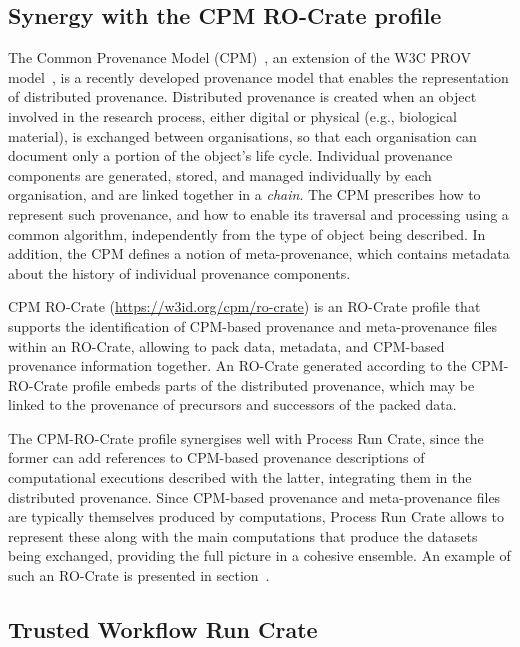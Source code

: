 \documentclass[10pt,letterpaper]{article}
\begin{document}
    
  \subsection{Synergy with the CPM RO-Crate profile}\label{synergy-with-the-cpm-ro-crate-profile}
  
  The Common Provenance Model (CPM)~\cite{Wittner 2022}, an extension of the W3C PROV model~\cite{Moreau 2013}, is a recently developed provenance model that enables the representation of distributed provenance.
  Distributed provenance is created when an object involved in the research process, either digital or physical (e.g., biological material), is exchanged between organisations, so that each organisation can document only a portion of the object's life cycle.
  Individual provenance components are generated, stored, and managed individually by each organisation, and are linked together in a \emph{chain}.
  The CPM prescribes how to represent such provenance, and how to enable its traversal and processing using a common algorithm, independently from the type of object being described.
  In addition, the CPM defines a notion of meta-provenance, which contains metadata about the history of individual provenance components.
  
  CPM RO-Crate (\url{https://w3id.org/cpm/ro-crate}) is an RO-Crate profile that supports the identification of CPM-based provenance and meta-provenance files within an RO-Crate, allowing to pack data, metadata, and CPM-based provenance information together.
  An RO-Crate generated according to the CPM-RO-Crate profile embeds parts of the distributed provenance, which may be linked to the provenance of precursors and successors of the packed data.
  
  The CPM-RO-Crate profile synergises well with Process Run Crate, since the former can add references to CPM-based provenance descriptions of computational executions described with the latter, integrating them in the distributed provenance.
  Since CPM-based provenance and meta-provenance files are typically themselves produced by computations, Process Run Crate allows to represent these along with the main computations that produce the datasets being exchanged, providing the full picture in a cohesive ensemble.
  An example of such an RO-Crate is presented in section~\cite{Process Run Crate and CPM RO-Crate}.
  
  \subsection{Trusted Workflow Run Crate}\label{trusted-workflow-run-crate}
  
\end{document}
